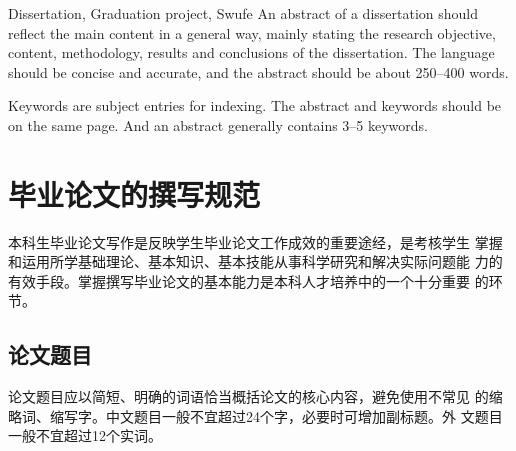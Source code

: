 \documentclass{swufethesis}
\begin{document}
\frontmatter

\maketitle

\statement


\begin{abstract}{毕业论文, 毕业设计, 西南财经大学}
  摘要内容应概括地反映出本论文的主要内容，主要说明本论文的研究目的、
  内容、方法、成果和结论。语言力求精练、准确，摘要字数300字左右。

  关键词是供检索用的主题词条。摘要与关键词应在同一页。关键词一般3--5个。
\end{abstract}

\begin{abstract*}{Dissertation, Graduation project, Swufe}
  An abstract of a dissertation should reflect the main content in a general way,
  mainly stating the research objective, content, methodology, results and conclusions
  of the dissertation. The language should be concise and accurate, and the abstract
  should be about 250--400 words.

  Keywords are subject entries for indexing. The abstract and keywords should be
  on the same page. And an abstract generally contains 3--5 keywords.
\end{abstract*}

\tableofcontents

\mainmatter
\chapter{毕业论文的撰写规范}
本科生毕业论文写作是反映学生毕业论文工作成效的重要途经，是考核学生
掌握和运用所学基础理论、基本知识、基本技能从事科学研究和解决实际问题能
力的有效手段。掌握撰写毕业论文的基本能力是本科人才培养中的一个十分重要
的环节。
\section{论文题目}
论文题目应以简短、明确的词语恰当概括论文的核心内容，避免使用不常见
的缩略词、缩写字。中文题目一般不宜超过24个字，必要时可增加副标题。外
文题目一般不宜超过12个实词。
\end{document}
